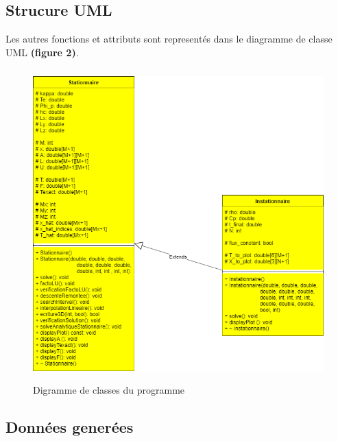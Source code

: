 \documentclass[11pt]{article} %
\begin{document}
	\subsection{Strucure UML}
	
	Les autres fonctions et attributs sont representés dans le diagramme de classe UML \textbf{(figure 2)}.
		\begin{figure}[!htb]
			\centering
			\includegraphics[height=12cm]{fig_2}
			\caption{Digramme de classes du programme}
		\end{figure}
	
	\subsection{Données generées}
	
\end{document}
